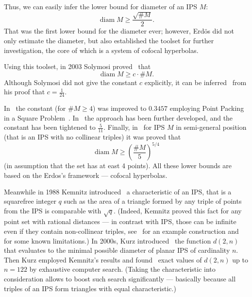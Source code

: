 \documentclass[a4paper,14pt]{article} %
\theoremstyle{plain}
\theoremstyle{definition}
\DeclareMathOperator{\diam}{diam}
\begin{document}
	Thus, we can easily infer the lower bound for diameter of an IPS $M$:
	$$
		\operatorname{diam} M \ge \frac{\sqrt{\#M}}{2}.
	$$
	That was the first lower bound for the diameter ever;
	however, Erdös did not only estimate the diameter,
	but also established the toolset for further investigation, the core of which is a system of cofocal hyperbolas.

	Using this toolset, in 2003 Solymosi proved~\cite{solymosi2003note} that
	$$
		\operatorname{diam} M \ge c \cdot \#M.
	$$
	Although Solymosi did not give the constant $c$ explicitly,
	it can be inferred~\cite{our-vmmsh-2018-translit} from his proof that $c=\frac{1}{24}$.

	In~\cite{our-vmmsh-2018-translit} the constant (for $\# M \geq 4$) was improved to $0.3457$
	employing Point Packing in a Square Problem~\cite{markot2005newverified,costa2013valid}.
	In~\cite{my-pps-linear-bound-2019} the approach has been further developed, and the constant has been tightened to $\frac{5}{11}$.
	Finally, in~\cite{my-semi-general-5-4-bound-2019} for IPS $M$ in semi-general position (that is an IPS with no collinear triples) it was proved that
	\begin{equation}
		\label{eq:chebsb_lower_bound}
		\diam M \geq \left(\frac {\# M} 5 \right)^{5/4}
	\end{equation}
	(in assumption that the set has at east 4 points).
	All these lower bounds are based on the Erdos's framework --- cofocal hyperbolas.


	Meanwhile in 1988 Kemnitz introduced~\cite{kemnitz1988punktmengen}
	a characteristic of an IPS, that is a squarefree integer $q$ such as the area
	of a triangle formed by any triple of points from the IPS is comparable with $\sqrt{q}$.
	(Indeed, Kemnitz proved this fact for any point set with rational distances ---
	in contrast with IPS, those can be infinite even if they contain non-collinear triples,
	see~\cite{huff1948diophantine} for an example construction
	and~\cite{solymosi2010question} for some known limitations.)
	In 2000s, Kurz introduced~\cite{kurz2005characteristic} the function $d(2,n)$ that evaluates
	to the minimal possible diameter of planar IPS of cardinality $n$.
	Then Kurz employed Kemnitz's results and found~\cite[Subsection 4.2]{kurz2008minimum} exact values of $d(2,n)$
	up to $n=122$ by exhaustive computer search.
	(Taking the characteristic into consideration allows to boost such search significantly ---
	basically because all triples of an IPS form triangles with equal characteristic.)
\end{document}
